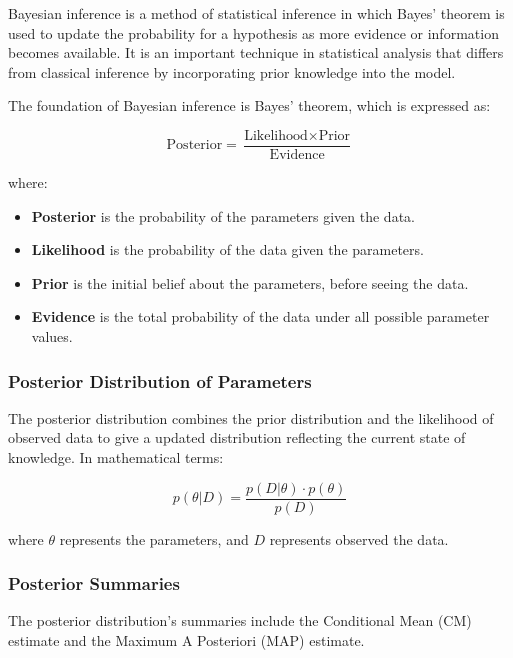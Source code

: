 \documentclass{article}
\begin{document}
Bayesian inference is a method of statistical inference in which Bayes' theorem is used to update the probability for a hypothesis as more evidence or information becomes available. It is an important technique in statistical analysis that differs from classical inference by incorporating prior knowledge into the model.

The foundation of Bayesian inference is Bayes' theorem, which is expressed as:

$$
\text{Posterior} = \frac{\text{Likelihood} \times \text{Prior}}{\text{Evidence}}
$$

where:
\begin{itemize}
    \item \textbf{Posterior} is the probability of the parameters given the data.
    \item \textbf{Likelihood} is the probability of the data given the parameters.
    \item \textbf{Prior} is the initial belief about the parameters, before seeing the data.
    \item \textbf{Evidence} is the total probability of the data under all possible parameter values.
\end{itemize}

\subsubsection{Posterior Distribution of Parameters}

The posterior distribution combines the prior distribution and the likelihood of observed data to give a updated distribution reflecting the current state of knowledge. In mathematical terms:

$$
p(\theta | D) = \frac{p(D | \theta) \cdot p(\theta)}{p(D)}
$$

where \( \theta \) represents the parameters, and \( D \) represents observed the data.

\subsubsection{Posterior Summaries}

The posterior distribution's summaries include the Conditional Mean (CM) estimate and the Maximum A Posteriori (MAP) estimate.
\end{document}
